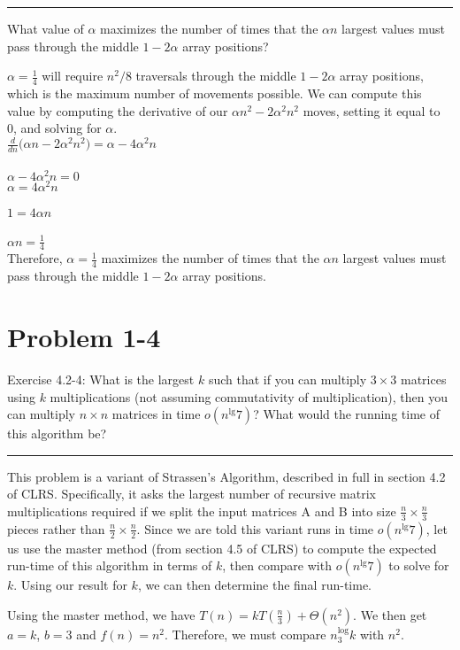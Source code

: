 \documentclass[11pt]{article}
\def\separateline{\medskip\hrule\medskip}
\begin{document}
\separateline
What value of $\alpha$ maximizes the number of times that the $\alpha n$ largest values must pass through the middle $1 - 2\alpha$ array positions?

$\alpha = \frac{1}{4}$ will require $n^2/8$ traversals through the middle $1 - 2\alpha$ array positions, which is the maximum number of movements possible. We can compute this value by computing the derivative of our $\alpha n^2 - 2\alpha^2 n^2$ moves, setting it equal to 0, and solving for $\alpha$.\\

$ \frac{d}{dn} \Big( \alpha n - 2 \alpha^2 n^2 \Big) = \alpha - 4 \alpha^2 n$\\\\
$\alpha - 4 \alpha^2 n = 0$\\
$\alpha = 4 \alpha^2n$\\\\
$1 = 4 \alpha n$\\\\
$\alpha n = \frac{1}{4}$\\

Therefore, $\alpha = \frac{1}{4}$ maximizes the number of times that the $\alpha n$ largest values must pass through the middle $1 - 2\alpha$ array positions.


\newpage

\section{Problem 1-4}
Exercise 4.2-4: What is the largest $k$ such that if you can multiply $3 \times 3$ matrices using $k$ multiplications (not assuming commutativity of multiplication), then you can multiply $n \times n$ matrices in time $o(n^\lg{7})$? What would the running time of this algorithm be?
\separateline

This problem is a variant of Strassen's Algorithm, described in full in section 4.2 of CLRS. Specifically, it asks the largest number of recursive matrix multiplications required if we split the input matrices A and B into size $\frac{n}{3} \times \frac{n}{3}$ pieces rather than $\frac{n}{2} \times \frac{n}{2}$. Since we are told this variant runs in time $o(n^\lg{7})$, let us use the master method (from section 4.5 of CLRS) to compute the expected run-time of this algorithm in terms of $k$, then compare with $o(n^\lg{7})$ to solve for $k$. Using our result for $k$, we can then determine the final run-time.

Using the master method, we have $T(n) = kT(\frac{n}{3}) + \Theta(n^2)$. We then get $a = k$, $b = 3$ and $f(n) = n^2$. Therefore, we must compare $n^\log_3{k}$ with $n^2$.
\end{document}
